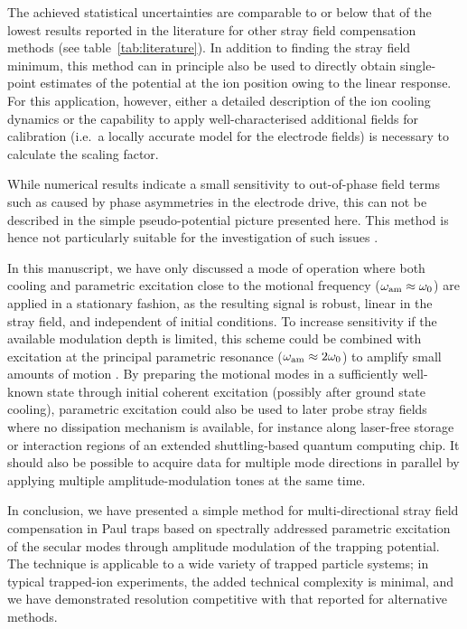 \documentclass[pra,twocolumn]{revtex4-2}
\begin{document}
The achieved statistical uncertainties are comparable to or below that of the lowest results reported in the literature for other stray field compensation methods (see table~\ref{tab:literature}).
In addition to finding the stray field minimum, this method can in principle also be used to directly obtain single-point estimates of the \RF{} potential at the ion position owing to the linear response.
For this application, however, either a detailed description of the ion cooling dynamics or the capability to apply well-characterised additional fields for calibration (i.e.~a locally accurate model for the \DC{} electrode fields) is necessary to calculate the scaling factor.

While numerical results indicate a small sensitivity to out-of-phase \RF{} field terms such as caused by phase asymmetries in the \RF{} electrode drive, this can not be described in the simple pseudo-potential picture presented here. This method is hence not particularly suitable for the investigation of such issues \cite{berkelandMinimizationIonMicromotion1998,mohammadiMinimizingRfinducedExcess2019}.

In this manuscript, we have only discussed a mode of operation where both cooling and parametric excitation close to the motional frequency ($\omega_{\textrm{am}} \approx \omega_{\textrm{0}}$) are applied in a stationary fashion, as the resulting signal is robust, linear in the stray field, and independent of initial conditions.
To increase sensitivity if the available modulation depth is limited, this scheme could be combined with excitation at the principal parametric resonance ($\omega_{\textrm{am}} \approx 2 \omega_{\textrm{0}}$) to amplify small amounts of motion \cite{yuNoiseFreeParametric1993}.
By preparing the motional modes in a sufficiently well-known state through initial coherent excitation (possibly after ground state cooling), parametric excitation could also be used to later probe stray fields where no dissipation mechanism is available, for instance along laser-free storage or interaction regions of an extended shuttling-based quantum computing chip.
It should also be possible to acquire data for multiple mode directions in parallel by applying multiple amplitude-modulation tones at the same time.

In conclusion, we have presented a simple method for multi-directional stray field compensation in Paul traps based on spectrally addressed parametric excitation of the secular modes through amplitude modulation of the \RF{} trapping potential.
The technique is applicable to a wide variety of trapped particle systems; in typical trapped-ion experiments, the added technical complexity is minimal, and we have demonstrated resolution competitive with that reported for alternative methods.
\end{document}
